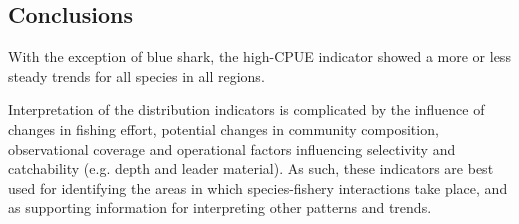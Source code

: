 \documentclass[12pt]{SCreport}
\begin{document}

\clearpage         
        
     
          
  \subsection{Conclusions}
  
 With the exception of blue shark, the high-CPUE indicator showed a more or less steady trends for all species in all regions. %
  
Interpretation of the distribution indicators is complicated by the influence of changes in fishing effort,  potential  changes in community composition, observational coverage  and operational factors influencing selectivity and catchability (e.g. depth and leader material). As such, these indicators are best used for identifying the areas in which species-fishery interactions take place, and as supporting information for interpreting other patterns and trends. 

      
\end{document}
